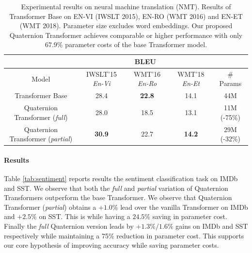 \documentclass[11pt,a4paper]{article}
\begin{document}
\begin{table}
  \centering
  \small
    \begin{tabular}{c|c|c|c|c}
    \hline
          & \multicolumn{3}{c|}{BLEU} &  \\
         \hline
          Model & \multicolumn{1}{c|}{IWSLT'15 \textit{En-Vi}} & \multicolumn{1}{c|}{WMT'16 \textit{En-Ro}} &\multicolumn{1}{c|}{WMT'18 \textit{En-Et}} &\multicolumn{1}{c}{\# Params} \\
          \hline
    Transformer Base & 28.4 & \textbf{22.8} &14.1& 44M \\
      Quaternion Transformer (\emph{full}) & 28.0 & 18.5 & 13.1 & 11M (-75\%)\\
    Quaternion Transformer (\emph{partial}) & \textbf{30.9} & 22.7 & \textbf{14.2} & 29M (-32\%)\\





    \hline
    \end{tabular}%
     \caption{Experimental results on neural machine translation (NMT). Results of Transformer Base on EN-VI (IWSLT 2015), EN-RO (WMT 2016) and EN-ET (WMT 2018). Parameter size excludes word embeddings. Our proposed Quaternion Transformer achieves comparable or higher performance with only $67.9\%$ parameter costs of the base Transformer model.}
  \label{tab:nmt}%
\end{table}%



\paragraph{Results} Table \ref{tab:sentiment} reports results the sentiment classification task on IMDb and SST. We observe that both the \emph{full} and \emph{partial} variation of Quaternion Transformers outperform the base Transformer. We observe that Quaternion Transformer (\emph{partial}) obtains a $+1.0\%$ lead over the vanilla Transformer on IMDb and $+2.5\%$ on SST. This is while having a $24.5\%$ saving in parameter cost. Finally the \emph{full} Quaternion version leads by $+1.3\%/1.6\%$ gains on IMDb and SST respectively while maintaining a 75\% reduction in parameter cost. This supports our core hypothesis of improving accuracy while saving parameter costs.
\end{document}
